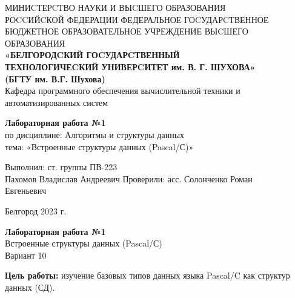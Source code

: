 \documentclass[a4paper,14pt]{extarticle}
\newcommand\textbox[1]{
	\parbox{.45\textwidth}{#1}
}
\begin{document}
\begin{center}
	\small{
		МИНИCТЕРCТВО НАУКИ И ВЫCШЕГО ОБРАЗОВАНИЯ \\РОCCИЙCКОЙ ФЕДЕРАЦИИ
		\bigbreak
		ФЕДЕРАЛЬНОЕ ГОCУДАРCТВЕННОЕ БЮДЖЕТНОЕ ОБРАЗОВАТЕЛЬНОЕ УЧРЕЖДЕНИЕ ВЫCШЕГО ОБРАЗОВАНИЯ \\
		\bigbreak
		\textbf{«БЕЛГОРОДCКИЙ ГОCУДАРCТВЕННЫЙ \\ТЕХНОЛОГИЧЕCКИЙ УНИВЕРCИТЕТ им. В. Г. ШУХОВА»\\ (БГТУ им. В.Г. Шухова)} \\
		\bigbreak
		Кафедра программного обеспечения вычислительной техники и автоматизированных систем\\}
\end{center}

\vfill
\begin{center}
	\large{
		\textbf{
			Лабораторная работа №1}}\\
	\normalsize{
		по дисциплине: Алгоритмы и структуры данных \\
		тема: «Встроенные структуры данных (Pascal/С)»}
\end{center}
\vfill
\hfill\textbox{
	Выполнил: ст. группы ПВ-223\\Пахомов Владислав Андреевич
	\bigbreak
	Проверили: асс. Солонченко Роман\\Евгеньевич
}
\vfill\begin{center}
	Белгород 2023 г.
\end{center}
\newpage
\begin{center}
	\textbf{Лабораторная работа №1}\\
	Встроенные структуры данных (Pascal/С)\\
	Вариант 10
\end{center}
\textbf{Цель работы: }изучение базовых типов данных языка Pascal/C как структур данных (СД).
\end{document}
